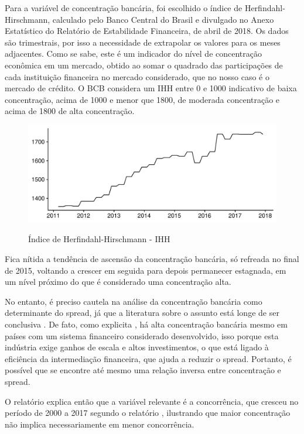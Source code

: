 \documentclass[a4paper,
               article,
               12pt,
               openany,
               oneside,
               english,
               brazil]{abntex2}
\numberwithin{equation}{section}
\begin{document}
    Para a variável de concentração bancária, foi escolhido o índice de Herfindahl-Hirschmann, calculado pelo Banco Central do Brasil e divulgado no Anexo Estatístico do Relatório de Estabilidade Financeira, de abril de 2018. Os dados são trimestrais, por isso a necessidade de extrapolar os valores para os meses adjacentes. Como se sabe, este é um indicador do nível de concentração econômica em um mercado, obtido ao somar o quadrado das participações de cada instituição financeira no mercado considerado, que no nosso caso é o mercado de crédito. O BCB considera um IHH entre 0 e 1000 indicativo de baixa concentração, acima de 1000 e menor que 1800, de moderada concentração e acima de 1800 de alta concentração.

    \begin{figure}[h]
        \centering
        \caption{Índice de Herfindahl-Hirschmann - IHH}
        \includegraphics[width = \textwidth, scale=0.75]{IHH.pdf}
        \label{ihh}
    \end{figure}

    Fica nítida a tendência de ascensão da concentração bancária, só refreada no final de 2015, voltando a crescer em seguida para depois permanecer estagnada, em um nível próximo do que é considerado uma concentração alta.

    No entanto, é preciso cautela na análise da concentração bancária como determinante do spread, já que a literatura sobre o assunto está longe de ser conclusiva \cite[p.~11]{reb2017}. De fato, como explicita , há alta concentração bancária mesmo em países com um sistema financeiro considerado desenvolvido, isso porque esta indústria exige ganhos de escala e altos investimentos, o que está ligado à eficiência da intermediação financeira, que ajuda a reduzir o spread. Portanto, é possível que se encontre até mesmo uma relação inversa entre concentração e spread. 

    O relatório explica então que a variável relevante é a concorrência, que cresceu no período de 2000 a 2017 segundo o relatório \cite[p.~11]{reb2017}, ilustrando que maior concentração não implica necessariamente em menor concorrência.
\end{document}
